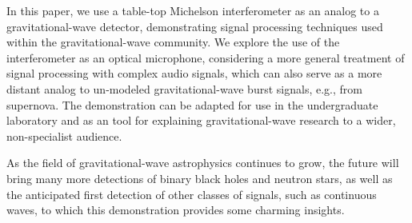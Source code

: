 \documentclass[paper-main.tex]{subfiles}
\begin{document}


In this paper, we use a table-top Michelson interferometer as an analog to a gravitational-wave detector, demonstrating signal processing techniques used within the gravitational-wave community.
We explore the use of the interferometer as an optical microphone, considering a more general treatment of signal processing with complex audio signals, which can also serve as a more distant analog to un-modeled gravitational-wave burst signals, e.g., from supernova.
The demonstration can be adapted for use in the undergraduate laboratory and as an tool for explaining gravitational-wave research to a wider, non-specialist audience. 


\begin{comment}

The demonstration presented has the potential to be adapted for use in the undergraduate laboratory.
It can be used to teach topics of interest to physics and electrical engineering students including interferometer physics; gravitational-wave detection, searches, and analysis; and signal processing with filters and speech enhancement techniques. 
The increased excitement and public interest in the field of gravitational-wave research in recent years mean that this demonstration may also be adapted as a tool for explaining gravitational-wave research to a wider, non-specialist audience. 

\end{comment}

As the field of gravitational-wave astrophysics continues to grow, the future will bring many more detections of binary black holes and neutron stars, as well as the anticipated first detection of other classes of signals, such as continuous waves, to which this demonstration provides some charming insights. 
\end{document}
